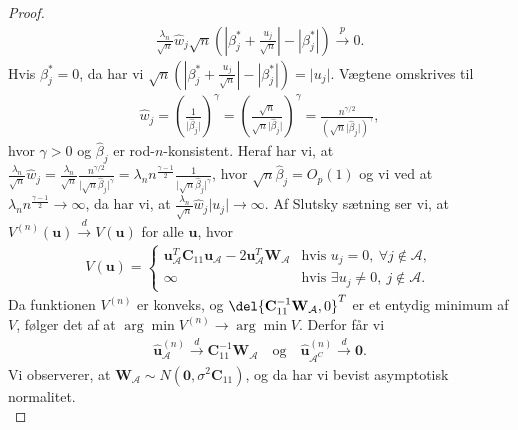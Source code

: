 \begin{proof}
\begin{align*}
\frac{ \lambda_n}{\sqrt{n}} \widehat{w}_j \sqrt{n} \left(\left\vert \beta_j^{*} +\frac{u_j}{\sqrt{n}} \right\vert - \left\vert \beta_j^{*} \right\vert \right) \overset{p}{\rightarrow} 0.
\end{align*}
Hvis $\beta_j^{*} = 0$, da har vi $\sqrt{n} \left( \left\vert \beta_j^{*} +\frac{u_j}{\sqrt{n}} \right\vert - \left\vert \beta_j^{*} \right\vert \right) = \vert u_j \vert$.
Vægtene omskrives til
\begin{align*}
\widehat{w}_j= \left( \frac{1}{\vert \widehat{\beta}_j \vert} \right)^\gamma=\left( \frac{\sqrt{n}}{\sqrt{n} \vert \widehat{\beta}_j \vert} \right)^\gamma = \frac{n^{\gamma/2}}{ \left( \sqrt{n} \vert \widehat{\beta}_j \vert \right)^\gamma},
\end{align*} 
hvor $\gamma >0$ og $\widehat{\beta}_j$ er rod-$n$-konsistent. Heraf har vi, at $\frac{\lambda_n}{\sqrt{n}} \widehat{w}_j = \frac{\lambda_n}{\sqrt{n}} \frac{n^{\gamma/2}}{\vert \sqrt{n} \widehat{\beta}_j \vert^\gamma} = \lambda_n n^{\frac{\gamma -1}{2}} \frac{1}{\vert \sqrt{n} \widehat{\beta}_j \vert^\gamma} $, hvor $\sqrt{n} \widehat{\beta}_j = O_p(1)$ og vi ved at  $\lambda_n n^\frac{\gamma-1}{2} \rightarrow \infty$, da har vi, at $\frac{\lambda_n}{\sqrt{n}} \widehat{w}_j  \vert u_j \vert \rightarrow \infty$.
Af Slutsky sætning ser vi, at $V^{(n)} (\mathbf{u}) \overset{d}{\rightarrow} V(\textbf{u})$ for alle $\mathbf{u}$, hvor
\begin{align*}
V(\textbf{u}) = \begin{cases}
    \mathbf{u}_\mathcal{A}^T \mathbf{C}_{11} \mathbf{u}_\mathcal{A}-2\mathbf{u}^T_\mathcal{A} \mathbf{W}_\mathcal{A} & \text{hvis  $u_j=0, \ \forall j \notin \mathcal{A} $},\\
    \infty & \text{hvis } \exists u_j \neq 0, \ j \notin \mathcal{A} .
  \end{cases}
\end{align*}
Da funktionen $V^{(n)}$ er konveks, og $ \del{\mathbf{C}_{11}^{-1} \mathbf{W_\mathcal{A}},0}^T$ er et entydig minimum af $V$, følger det af \citep{adaptive_lasso} at 
$\arg\min V^{(n)} \rightarrow \arg\min V$.
Derfor får vi
\begin{align}
\widehat{\mathbf{u}}_\mathcal{A}^{(n)} \overset{d}{\rightarrow} \mathbf{C}_{11}^{-1} \mathbf{W}_\mathcal{A} \quad \text{og} \quad \widehat{\mathbf{u}}_{\mathcal{A}^C}^{(n)} \overset{d}{\rightarrow} \mathbf{0}. \label{eq:minUA}
\end{align}
Vi observerer, at $\mathbf{W}_\mathcal{A} \sim N(\mathbf{0}, \sigma^2 \mathbf{C}_{11})$, og da har vi bevist asymptotisk normalitet. \\


\end{proof}
